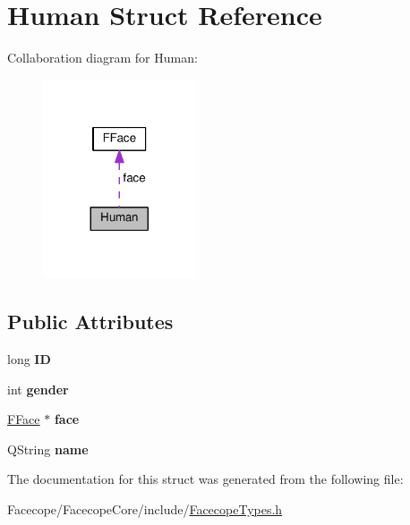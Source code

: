 \hypertarget{structHuman}{}\section{Human Struct Reference}
\label{structHuman}


Collaboration diagram for Human\+:
\nopagebreak
\begin{figure}[H]
\begin{center}
\leavevmode
\includegraphics[width=128pt]{structHuman__coll__graph}
\end{center}
\end{figure}
\subsection*{Public Attributes}
\begin{DoxyCompactItemize}
\item 
\mbox{\label{structHuman_a2f4d76356ea6ad90208b706a61228d1b}} 
long {\bfseries ID}
\item 
\mbox{\label{structHuman_a050c55e13eaf9b724e7cf83b12df7132}} 
int {\bfseries gender}
\item 
\mbox{\label{structHuman_a314b5ed988ef463a5479c5a864578367}} 
\hyperlink{classFFace}{F\+Face} $\ast$ {\bfseries face}
\item 
\mbox{\label{structHuman_a97161abcfebe9461ef612f6cfde11e67}} 
Q\+String {\bfseries name}
\end{DoxyCompactItemize}


The documentation for this struct was generated from the following file\+:\begin{DoxyCompactItemize}
\item 
Facecope/\+Facecope\+Core/include/\hyperlink{FacecopeTypes_8h}{Facecope\+Types.\+h}\end{DoxyCompactItemize}
